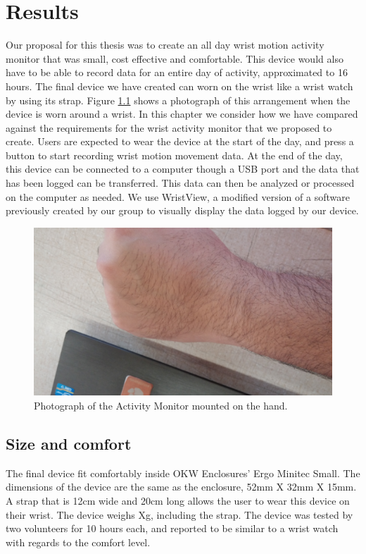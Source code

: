 \chapter{Results}
\label{Chap:Results}

Our proposal for this thesis was to create an all day wrist motion activity monitor
that was small, cost effective and comfortable.
This device would also have to be able to record data for an entire day of activity,
approximated to 16 hours.
The final device we have created can worn on the wrist like a wrist watch by using its strap.
Figure \ref{Fig:WristPhoto} shows a photograph of this arrangement when the device is worn around a wrist.
In this chapter we consider how we have compared against the requirements for the wrist activity monitor that we proposed to create.
Users are expected to wear the device at the start of the day,
and press a button to start recording wrist motion movement data.
At the end of the day,
this device can be connected to a computer though a USB port and the data that has been logged can be transferred.
This data can then be analyzed or processed on the computer as needed.
We use WristView, a modified version of a software previously created by our group to visually display the data logged by our device. 
\begin{figure}
\begin{center}
\includegraphics[width=\textwidth]{images/WristPhoto.jpg}
\caption{Photograph of the Activity Monitor mounted on the hand.}
\label{Fig:WristPhoto}
\end{center}
\end{figure}

\section{Size and comfort}
\label{Sec:ResultsSize}
The final device fit comfortably inside OKW Enclosures' Ergo Minitec Small.
The dimensions of the device are the same as the enclosure,
52mm X 32mm X 15mm.
A strap that is 12cm wide and 20cm long allows the user to wear this device on their wrist.
The device weighs Xg, including the strap.
The device was tested by two volunteers for 10 hours each,
and reported to be similar to a wrist watch with regards to the comfort level.

